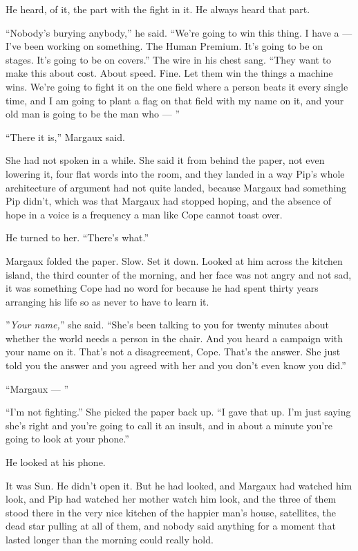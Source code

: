 \documentclass[11pt,openany]{book}
\begin{document}
He heard, of it, the part with the fight in it. He always heard that part.

``Nobody's burying anybody,'' he said. ``We're going to win this thing. I have a --- I've been working on something. The Human Premium. It's going to be on stages. It's going to be on covers.'' The wire in his chest sang. ``They want to make this about cost. About speed. Fine. Let them win the things a machine wins. We're going to fight it on the one field where a person beats it every single time, and I am going to plant a flag on that field with my name on it, and your old man is going to be the man who --- ''

``There it is,'' Margaux said.

She had not spoken in a while. She said it from behind the paper, not even lowering it, four flat words into the room, and they landed in a way Pip's whole architecture of argument had not quite landed, because Margaux had something Pip didn't, which was that Margaux had stopped hoping, and the absence of hope in a voice is a frequency a man like Cope cannot toast over.

He turned to her. ``There's what.''

Margaux folded the paper. Slow. Set it down. Looked at him across the kitchen island, the third counter of the morning, and her face was not angry and not sad, it was something Cope had no word for because he had spent thirty years arranging his life so as never to have to learn it.

''\textit{Your name,}'' she said. ``She's been talking to you for twenty minutes about whether the world needs a person in the chair. And you heard a campaign with your name on it. That's not a disagreement, Cope. That's the answer. She just told you the answer and you agreed with her and you don't even know you did.''

``Margaux --- ''

``I'm not fighting.'' She picked the paper back up. ``I gave that up. I'm just saying she's right and you're going to call it an insult, and in about a minute you're going to look at your phone.''

He looked at his phone.

It was Sun. He didn't open it. But he had looked, and Margaux had watched him look, and Pip had watched her mother watch him look, and the three of them stood there in the very nice kitchen of the happier man's house, satellites, the dead star pulling at all of them, and nobody said anything for a moment that lasted longer than the morning could really hold.
\end{document}
